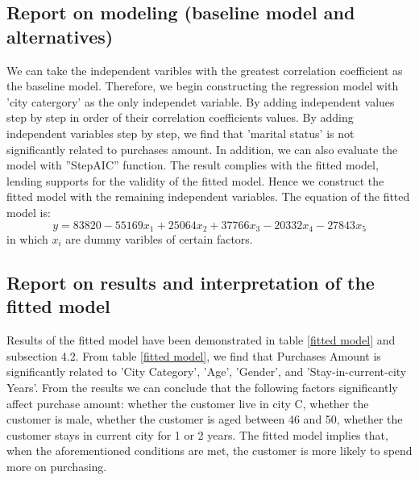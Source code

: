 \documentclass{zjureport}
\begin{document}
\subsection{Report on modeling (baseline model and alternatives)}
We can take the independent varibles with the greatest correlation coefficient as the baseline model. Therefore, we begin constructing the regression model with 'city catergory' as the only independet variable. By adding independent values step by step in order of their correlation coefficients values. By adding independent variables step by step, we find that 'marital status' is not significantly related to purchases amount.  In addition, we can also evaluate the model with ''StepAIC'' function. The result complies with the fitted model, lending supports for the validity of the fitted model. Hence we construct the fitted model with the remaining independent variables. The equation of the fitted model is:
\begin{equation}
	y = 83820 - 55169x_{1} + 25064x_{2} + 37766x_{3} - 20332x_{4} - 27843x_{5} 
\end{equation} 
in which $x_{i}$ are dummy varibles of certain factors. 
\subsection{Report on results and interpretation of the fitted model}
Results of the fitted model have been demonstrated in table \ref{fitted model} and subsection 4.2.  From table \ref{fitted model}, we find that Purchases Amount is significantly related to 'City Category', 'Age', 'Gender', and 'Stay-in-current-city Years'. From the results we can conclude that the following factors significantly affect purchase amount: whether the customer live in city C, whether the customer is male, whether the customer is aged between 46 and 50, whether the customer stays in current city for 1 or 2 years. The fitted model implies that, when the aforementioned conditions are met, the customer is more likely to spend more on purchasing.
\end{document}

